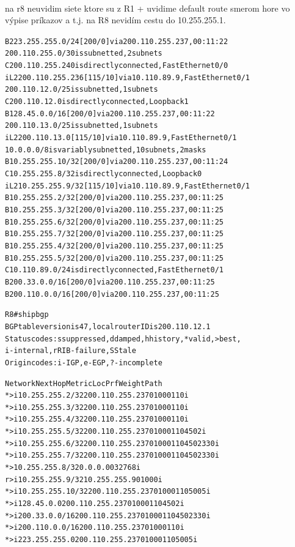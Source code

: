 \documentclass[12pt,twoside,a4paper]{report}
\begin{document}
\paragraph{}
na r8 neuvidim siete ktore su z R1 + uvidime default route smerom hore vo výpise príkazov  a  t.j. na R8 nevidím cestu do 10.255.255.1.

\noindent
{\selectfont
\begin{small}
\begin{alltt}
B    223.255.255.0/24 [200/0] via 200.110.255.237, 00:11:22
     200.110.255.0/30 is subnetted, 2 subnets
C       200.110.255.240 is directly connected, FastEthernet0/0
i L2    200.110.255.236 [115/10] via 10.110.89.9, FastEthernet0/1
     200.110.12.0/25 is subnetted, 1 subnets
C       200.110.12.0 is directly connected, Loopback1
B    128.45.0.0/16 [200/0] via 200.110.255.237, 00:11:22
     200.110.13.0/25 is subnetted, 1 subnets
i L2    200.110.13.0 [115/10] via 10.110.89.9, FastEthernet0/1
     10.0.0.0/8 is variably subnetted, 10 subnets, 2 masks
B       10.255.255.10/32 [200/0] via 200.110.255.237, 00:11:24
C       10.255.255.8/32 is directly connected, Loopback0
i L2    10.255.255.9/32 [115/10] via 10.110.89.9, FastEthernet0/1
B       10.255.255.2/32 [200/0] via 200.110.255.237, 00:11:25
B       10.255.255.3/32 [200/0] via 200.110.255.237, 00:11:25
B       10.255.255.6/32 [200/0] via 200.110.255.237, 00:11:25
B       10.255.255.7/32 [200/0] via 200.110.255.237, 00:11:25
B       10.255.255.4/32 [200/0] via 200.110.255.237, 00:11:25
B       10.255.255.5/32 [200/0] via 200.110.255.237, 00:11:25
C       10.110.89.0/24 is directly connected, FastEthernet0/1
B    200.33.0.0/16 [200/0] via 200.110.255.237, 00:11:25
B    200.110.0.0/16 [200/0] via 200.110.255.237, 00:11:25



R8#sh ip bgp
BGP table version is 47, local router ID is 200.110.12.1
Status codes: s suppressed, d damped, h history, * valid, > best, 
              i - internal, r RIB-failure, S Stale
Origin codes: i - IGP, e - EGP, ? - incomplete

   Network          Next Hop            Metric LocPrf Weight Path
*>i10.255.255.2/32  200.110.255.237          0    100      0 110 i
*>i10.255.255.3/32  200.110.255.237          0    100      0 110 i
*>i10.255.255.4/32  200.110.255.237          0    100      0 110 i
*>i10.255.255.5/32  200.110.255.237          0    100      0 110 4502 i
*>i10.255.255.6/32  200.110.255.237          0    100      0 110 4502 330 i
*>i10.255.255.7/32  200.110.255.237          0    100      0 110 4502 330 i
*> 10.255.255.8/32  0.0.0.0                  0         32768 i
r>i10.255.255.9/32  10.255.255.9             0    100      0 i
*>i10.255.255.10/32 200.110.255.237          0    100      0 110 5005 i
*>i128.45.0.0       200.110.255.237          0    100      0 110 4502 i
*>i200.33.0.0/16    200.110.255.237          0    100      0 110 4502 330 i
*>i200.110.0.0/16   200.110.255.237          0    100      0 110 i
*>i223.255.255.0    200.110.255.237          0    100      0 110 5005 i
\end{alltt}
\end{small}
}
\end{document}

